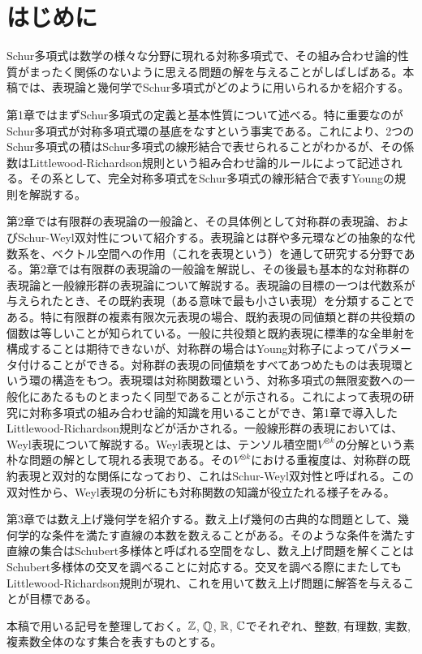 \chapter*{はじめに}
Schur多項式は数学の様々な分野に現れる対称多項式で、その組み合わせ論的性質がまったく関係のないように思える問題の解を与えることがしばしばある。本稿では、表現論と幾何学でSchur多項式がどのように用いられるかを紹介する。


第1章ではまずSchur多項式の定義と基本性質について述べる。特に重要なのがSchur多項式が対称多項式環の基底をなすという事実である。これにより、2つのSchur多項式の積はSchur多項式の線形結合で表せられることがわかるが、その係数はLittlewood-Richardson規則という組み合わせ論的ルールによって記述される。その系として、完全対称多項式をSchur多項式の線形結合で表すYoungの規則を解説する。


第2章では有限群の表現論の一般論と、その具体例として対称群の表現論、およびSchur-Weyl双対性について紹介する。表現論とは群や多元環などの抽象的な代数系を、ベクトル空間への作用（これを表現という）を通して研究する分野である。第2章では有限群の表現論の一般論を解説し、その後最も基本的な対称群の表現論と一般線形群の表現論について解説する。表現論の目標の一つは代数系が与えられたとき、その既約表現（ある意味で最も小さい表現）を分類することである。特に有限群の複素有限次元表現の場合、既約表現の同値類と群の共役類の個数は等しいことが知られている。一般に共役類と既約表現に標準的な全単射を構成することは期待できないが、対称群の場合はYoung対称子によってパラメータ付けることができる。対称群の表現の同値類をすべてあつめたものは表現環という環の構造をもつ。表現環は対称関数環という、対称多項式の無限変数への一般化にあたるものとまったく同型であることが示される。これによって表現の研究に対称多項式の組み合わせ論的知識を用いることができ、第1章で導入したLittlewood-Richardson規則などが活かされる。一般線形群の表現においては、Weyl表現について解説する。Weyl表現とは、テンソル積空間$V^{\otimes k}$の分解という素朴な問題の解として現れる表現である。その$V^{\otimes k}$における重複度は、対称群の既約表現と双対的な関係になっており、これはSchur-Weyl双対性と呼ばれる。この双対性から、Weyl表現の分析にも対称関数の知識が役立たれる様子をみる。

第3章では数え上げ幾何学を紹介する。数え上げ幾何の古典的な問題として、幾何学的な条件を満たす直線の本数を数えることがある。そのような条件を満たす直線の集合はSchubert多様体と呼ばれる空間をなし、数え上げ問題を解くことはSchubert多様体の交叉を調べることに対応する。交叉を調べる際にまたしてもLittlewood-Richardson規則が現れ、これを用いて数え上げ問題に解答を与えることが目標である。


本稿で用いる記号を整理しておく。$\mathbb{Z}$, $\mathbb{Q}$, $\mathbb{R}$, $\mathbb{C}$でそれぞれ、整数, 有理数, 実数, 複素数全体のなす集合を表すものとする。